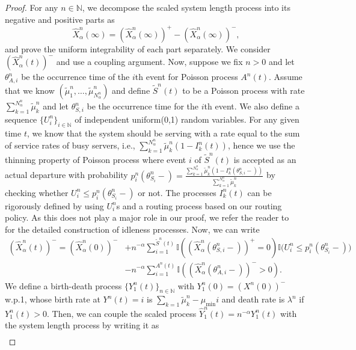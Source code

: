 \documentclass[a4paper,11pt,twoside]{article}
\numberwithin{equation}{section}
\numberwithin{figure}{section}
\theoremstyle{plain}
\newcommand{\II}{\mathbb{I}}
\newcommand{\NN}{\mathbb{N}}
\newcommand{\1}{\mathbbm{1}}
\begin{document}
\begin{proof}
For any $n\in \NN$, we decompose the scaled system length process into its negative and positive parts as
\[\hat{X}_\alpha^n(
\infty)=\left(\hat{X}_\alpha^n(\infty)\right)^+-\left(\hat{X}_\alpha^n(\infty)\right)^-,\]
and prove the uniform integrability of each part separately. 
We consider $\left(\hat{X}_\alpha^n(t)\right)^-$ and use a coupling argument. Now, suppose we fix $n>0$ and  let $\theta_{A,i}^n$ be the occurrence time of the $i$th event for Poisson process $A^n(t)$. Assume that we know $(\tilde{\mu}_1^n,\ldots, \tilde{\mu}_{N_\alpha^n}^n)$ and define $\tilde{S}^n(t)$ to be a Poisson process with rate $\sum_{k=1}^{N^n_\alpha}\tilde{\mu}_k^n$ and let $\theta_{S,i}^n$ be the occurrence time for the $i$th event. We also define a sequence $\{U_i^n\}_{i\in \NN}$ of independent uniform(0,1) random variables. For any given time $t$, we know that the system should be serving with a rate equal to the sum of service rates of busy servers, i.e., $\sum_{k=1}^{N^n_\alpha}\tilde{\mu}_k^n(1-I_k^n(t))$, hence we use the thinning property of Poisson process where event $i$ of $\tilde{S}^n(t)$ is accepted as an actual departure with probability $p_i^n(\theta_{S_i}^n-)=\frac{\sum_{k=1}^{N^n_\alpha}\tilde{\mu}_k^n(1-I_k^n(\theta_{S,i}^n-))}{\sum_{k=1}^{N^n_\alpha}\tilde{\mu}_k^n}$ by checking whether $U_i^n\leq p_i^n(\theta_{S_i}^n-)$ or not.
The processes $I_k^n(t)$ can be rigorously defined by using $U_i^n$s and a routing process based on our routing policy. As this does not play a major role in our proof, we refer the reader to ~\cite{bukeqin2019} for the detailed construction of idleness processes. Now, we can write 
\begin{align*}
    \left(\hat{X}_\alpha^n(t)\right)^-
    =
    \left(\hat{X}_\alpha^n(0)\right)^-
    & 
    +n^{-\alpha}\sum_{i=1}^{\tilde{S}^n(t)}\II\left(\left(\hat{X}_\alpha^n(\theta_{S,i}^n-)\right)^+=0\right)
    \II\Big(U_i^n\leq p_i^n\left(\theta_{S_i}^n-\right)\Big)
    \\
    &
    -n^{-\alpha}\sum_{i=1}^{A^n(t)}\II\left( \left(\hat{X}_\alpha^n(\theta_{A,i}^n-)\right)^->0\right).
\end{align*}
 We define a birth-death process $\{Y_1^n(t)\}_{n\in\NN}$ with $Y_1^n(0)=\left(X^n(0)\right)^-$ w.p.1, whose birth rate at $Y^n(t)=i$ is $\sum_{k=1}\tilde{\mu}_k^n-\mu_{\min}i$ and death rate is $\lambda^n$ if $Y_1^n(t)>0$. Then, we can couple the scaled process $\hat{Y}_1^n(t)=n^{-\alpha}Y_1^n(t)$ with the system length process by writing it as 
\begin{align*}

\end{align*}
\end{proof}
\end{document}
